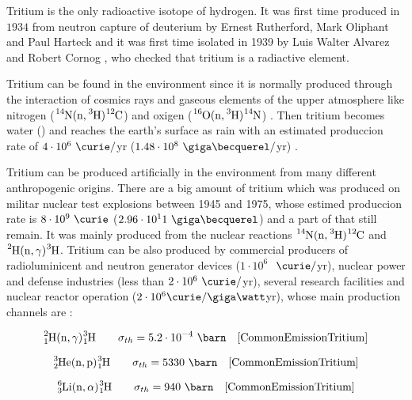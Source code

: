 Tritium is the only radioactive isotope of hydrogen. It was first time produced in $1934$ from neutron capture of deuterium by Ernest Rutherford, Mark Oliphant and Paul Harteck \cite{TritiumDiscovery} and it was first time isolated in 1939 by Luis Walter Alvarez and Robert Cornog \cite{TritiumIsolate}, who checked that tritium is a radiactive element. 

Tritium can be found in the environment since it is normally produced through the interaction of cosmics rays and gaseous elements of the upper atmosphere like nitrogen ($\ce{^{14}N}(\ce{n},\ce{^{3}H})\ce{^{12}C}$) \cite{TritiumHandling} and oxigen ($\ce{^{16}O}(\ce{n},\ce{^{3}H})\ce{^{14}N}$) \cite{OxigenTritium}. Then tritium becomes water () and reaches the earth's surface as rain with an estimated produccion rate of $4\cdot 10^6 ~\curie/$yr \newline ($1.48 \cdot 10^8 ~\giga\becquerel/$yr) \cite{CommonEmissionTritium} \cite{TritiumHandling} . 

Tritium can be produced artificially in the environment from many different anthropogenic origins. There are a big amount of tritium which was produced on militar nuclear test explosions between 1945 and 1975, whose estimed produccion rate is $8 \cdot 10^9~\curie$ ($2.96 \cdot 10^11~\giga\becquerel$) and a part of that still remain. It was mainly produced from the nuclear reactions $\ce{^{14}N}(\ce{n},\ce{^{3}H})\ce{^{12}C}$ and $\ce{^{2}H}(\ce{n},\gamma)\ce{^{3}H}$. Tritium can be also produced by commercial producers of radioluminicent and neutron generator devices ($1 \cdot 10^6$ $~\curie/$yr), nuclear power and defense industries (less than $2 \cdot 10^6~\curie/$yr), several research facilities and nuclear reactor operation ($2 \cdot 10^6 \curie/\giga\watt$yr), whose main production channels are \cite{CommonEmissionTritium} \cite{TritiumHandling}:

\begin{equation}
\ce{^{2}_{1}H}(\ce{n},\gamma)\ce{^{3}_{1}H} \qquad \sigma_{th}= 5.2 \cdot{} 10^{-4}~\barn  ~~~\cite{CommonEmissionTritium}
\label{eq:capneuH2}
\end{equation}

\begin{equation}
\ce{^{3}_{2}He}(\ce{n},\ce{p})\ce{^{3}_{1}H} \qquad \sigma_{th}= 5330~\barn ~~~\cite{CommonEmissionTritium}
\label{eq:capneuHe3}
\end{equation}

\begin{equation}
\ce{^{6}_{3}Li}(\ce{n},\alpha)\ce{^{3}_{1}H} \qquad \sigma_{th}= 940~\barn ~~~\cite{CommonEmissionTritium}
\label{eq:capneuLi6}
\end{equation}

